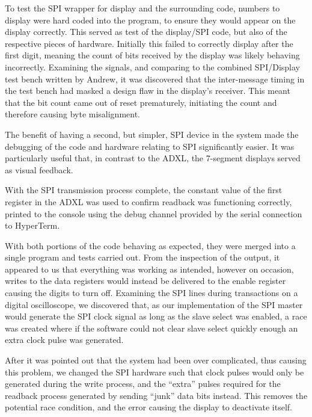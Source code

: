 \documentclass[11pt,british]{report}
\begin{document}
To test the SPI wrapper for display and the surrounding code, numbers to display were hard coded into the program, to ensure they would appear on the display correctly. This served as test of the display/SPI code, but also of the respective pieces of hardware. Initially this failed to correctly display after the first digit, meaning the count of bits received by the display was likely behaving incorrectly. Examining the signals, and comparing to the combined SPI/Display test bench written by Andrew, it was discovered that the inter-message timing in the test bench had masked a design flaw in the display's receiver. This meant that the bit count came out of reset prematurely, initiating the count and therefore causing byte misalignment.

The benefit of having a second, but simpler, SPI device in the system made the debugging of the code and hardware relating to SPI significantly easier. It was particularly useful that, in contrast to the ADXL, the 7-segment displays served as visual feedback.

With the SPI transmission process complete, the constant value of the first register in the ADXL was used to confirm readback was functioning correctly, printed to the console using the debug channel provided by the serial connection to HyperTerm.

With both portions of the code behaving as expected, they were merged into a single program and tests carried out. From the inspection of the output, it appeared to us that everything was working as intended, however on occasion, writes to the data registers would instead be delivered to the enable register causing the digits to turn off. Examining the SPI lines during transactions on a digital oscilloscope, we discovered that, as our implementation of the SPI master would generate the SPI clock signal as long as the slave select was enabled, a race was created where if the software could not clear slave select quickly enough an extra clock pulse was generated.

After it was pointed out that the system had been over complicated, thus causing this problem, we changed the SPI hardware such that clock pulses would only be generated during the write process, and the ``extra'' pulses required for the readback process generated by sending ``junk'' data bits instead. This removes the potential race condition, and the error causing the display to deactivate itself.
\end{document}
